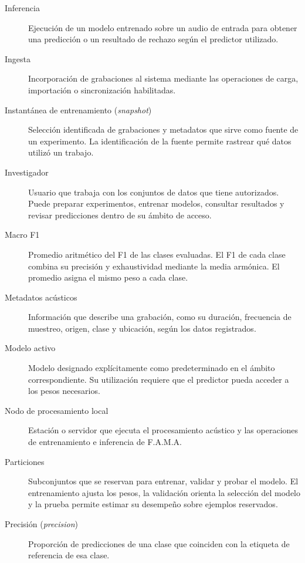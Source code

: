 \begin{description}
    \item[Inferencia] Ejecución de un modelo entrenado sobre un audio de
    entrada para obtener una predicción o un resultado de rechazo según
    el predictor utilizado.

    \item[Ingesta] Incorporación de grabaciones al sistema mediante las
    operaciones de carga, importación o sincronización habilitadas.

    \item[Instantánea de entrenamiento (\textit{snapshot})] Selección
    identificada de grabaciones y metadatos que sirve como fuente de un
    experimento. La identificación de la fuente permite rastrear qué
    datos utilizó un trabajo.

    \item[Investigador] Usuario que trabaja con los conjuntos de datos que
    tiene autorizados. Puede preparar experimentos, entrenar modelos,
    consultar resultados y revisar predicciones dentro de su ámbito de acceso.

    \item[Macro F1] Promedio aritmético del F1 de las clases evaluadas.
    El F1 de cada clase combina su precisión y exhaustividad mediante la
    media armónica. El promedio asigna el mismo peso a cada clase.

    \item[Metadatos acústicos] Información que describe una grabación,
    como su duración, frecuencia de muestreo, origen, clase y ubicación,
    según los datos registrados.

    \item[Modelo activo] Modelo designado explícitamente como
    predeterminado en el ámbito correspondiente. Su utilización requiere
    que el predictor pueda acceder a los pesos necesarios.

    \item[Nodo de procesamiento local] Estación o servidor que ejecuta
    el procesamiento acústico y las operaciones de entrenamiento e
    inferencia de F.A.M.A.

    \item[Particiones] Subconjuntos que se reservan para entrenar, validar
    y probar el modelo. El entrenamiento ajusta los pesos, la validación
    orienta la selección del modelo y la prueba permite estimar su
    desempeño sobre ejemplos reservados.

    \item[Precisión (\textit{precision})] Proporción de predicciones de
    una clase que coinciden con la etiqueta de referencia de esa clase.


\end{description}

